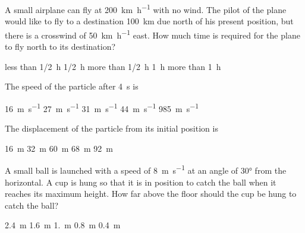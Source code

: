 \documentclass{../../../oss-ap12ibhl-print}
\begin{document}
\begin{questions}
  \question A small airplane can fly at \SI{200}{\kilo\metre\per\hour} with no
  wind. The pilot of the plane would like to fly to a destination
  \SI{100}{\kilo\metre} due north of his present position, but there is a
  crosswind of \SI{50}{\kilo\metre\per\hour} east. How much time is required
  for the plane to fly north to its destination?
  \begin{choices}
    \choice less than \SI{1/2}{\hour}
    \choice \SI{1/2}{\hour}
    \choice more than \SI{1/2}{\hour}
    \choice \SI{1}{\hour}
    \choice more than \SI{1}{\hour}
  \end{choices}


  \question The speed of the particle after \SI{4}{\second} is
  \begin{choices}
    \choice\SI{16}{\metre\per\second}
    \choice\SI{27}{\metre\per\second}
    \choice\SI{31}{\metre\per\second}
    \choice\SI{44}{\metre\per\second}
    \choice\SI{985}{\metre\per\second}
  \end{choices}
  \label{q:particle1}
    
  \question The displacement of the particle from its initial position is
  \begin{choices}
    \choice\SI{16}{\metre}
    \choice\SI{32}{\metre}
    \choice\SI{60}{\metre}
    \choice\SI{68}{\metre}
    \choice\SI{92}{\metre}
  \end{choices}
  \label{q:particle2}
    
  \question A small ball is launched with a speed of \SI{8}{\metre\per\second}
  at an angle of \ang{30} from the horizontal. A cup is hung so that it is in
  position to catch the ball when it reaches its maximum height. How far above
  the floor should the cup be hung to catch the ball?

  \begin{minipage}{.4\linewidth}
  \end{minipage}
  \begin{minipage}{.4\linewidth}
    \begin{choices}
      \choice\SI{2.4}{\metre}
      \choice\SI{1.6}{\metre}
      \choice\SI{1.}{\metre}
      \choice\SI{.8}{\metre}
      \choice\SI{.4}{\metre}
    \end{choices}
  \end{minipage}


\end{questions}
\end{document}
